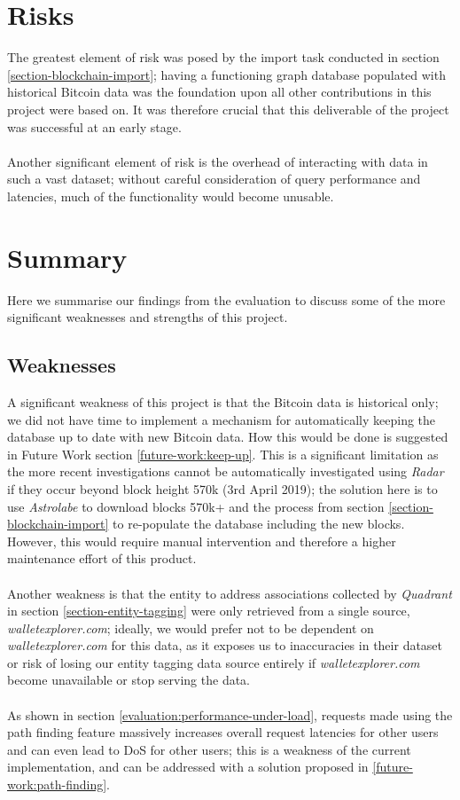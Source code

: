 \section{Risks}
The greatest element of risk was posed by the import task conducted in section \ref{section-blockchain-import}; having a functioning graph database populated with historical Bitcoin data was the foundation upon all other contributions in this project were based on. It was therefore crucial that this deliverable of the project was successful at an early stage. 
\\\\
Another significant element of risk is the overhead of interacting with data in such a vast dataset; without careful consideration of query performance and latencies, much of the functionality would become unusable. 

\section{Summary}
Here we summarise our findings from the evaluation to discuss some of the more significant weaknesses and strengths of this project.

\subsection{Weaknesses}
A significant weakness of this project is that the Bitcoin data is historical only; we did not have time to implement a mechanism for automatically keeping the database up to date with new Bitcoin data. How this would be done is suggested in Future Work section \ref{future-work:keep-up}. This is a significant limitation as the more recent investigations cannot be automatically investigated using \textit{Radar} if they occur beyond block height 570k (3rd April 2019); the solution here is to use \textit{Astrolabe} to download blocks 570k+ and the process from section \ref{section-blockchain-import} to re-populate the database including the new blocks. However, this would require manual intervention and therefore a higher maintenance effort of this product.
\\\\
Another weakness is that the entity to address associations collected by \textit{Quadrant} in section \ref{section-entity-tagging} were only retrieved from a single source, \textit{walletexplorer.com}; ideally, we would prefer not to be dependent on \textit{walletexplorer.com} for this data, as it exposes us to inaccuracies in their dataset or risk of losing our entity tagging data source entirely if \textit{walletexplorer.com} become unavailable or stop serving the data. 
\\\\
As shown in section \ref{evaluation:performance-under-load}, requests made using the path finding feature massively increases overall request latencies for other users and can even lead to DoS for other users; this is a weakness of the current implementation, and can be addressed with a solution proposed in \ref{future-work:path-finding}.

